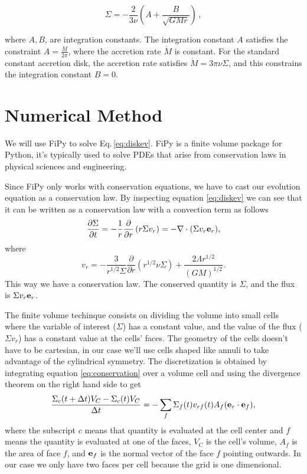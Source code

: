 \documentclass{article}
\begin{document}
\begin{equation}
\Sigma = -\frac{2}{3 \nu} \left(A+  \frac{B}{\sqrt{G M r}}\right)\,,
\end{equation}

where $A, B$, are integration constants. The integration constant $A$ satisfies the constraint $A = \frac{\dot{M}}{2\pi}$, where the accretion rate $\dot{M}$ is constant. For the standard constant accretion disk, the accretion rate satisfies $\dot{M} = 3\pi \nu \Sigma$, and this constrains the integration constant $B = 0$.

\section{Numerical Method}

We will use FiPy to solve Eq.\,\ref{eq:diskev}. FiPy is a finite volume package for Python, it's typically used to
solve PDEs that arise from conservation laws in physical sciences and engineering.

Since FiPy only works with conservation equations, we have to cast our evolution equation as a conservation law.
By inspecting equation \ref{eq:diskev} we can see that it can be written as a conservation law with a convection 
term as follows
\begin{equation} \label{eq:conservation}
\frac{\partial \Sigma}{\partial t} = -\frac{1}{r} \frac{\partial}{\partial r} \left( r \Sigma v_{r}\right)=-\nabla\cdot (\Sigma v_r \bold{e}_{r}),
\end{equation}
where
\begin{equation} \label{eq:vr}
v_r = -\frac{3}{r^{1/2}\Sigma} \frac{\partial}{\partial r} \left(r^{1/2} \nu \Sigma\right) + \frac{2 \Lambda r^{1/2}}{(G M)^{1/2}}.
\end{equation}
This way we have a conservation law. The conserved quantity is $\Sigma$, and the flux is $\Sigma v_r \bold{e}_r$.

The finite volume techinque consists on dividing the volume into small cells where the variable of interest ($\Sigma$) has a constant value,
and the value of the flux ($\Sigma v_r$) has a constant value at the cells' faces. The geometry of the cells doesn't have to be cartesian, in
our case we'll use cells shaped like annuli to take advantage of the cylindrical symmetry.
The discretization is obtained by integrating equation \ref{eq:conservation} over a volume cell and using the divergence theorem on the
right hand side to get
\begin{equation} \label{eq:discretization}
\frac{\Sigma_c(t+\Delta t) V_C - \Sigma_c(t) V_C}{\Delta t} =
-\sum_{f} \Sigma_{f}(t) v_{rf}(t) A_{f} (\bold{e}_r \cdot \bold{e}_{f}),
\end{equation}
where the subscript $c$ means that quantity is evaluated at the cell center and $f$ means the quantity is evaluated at one of the faces,
$V_C$ is the cell's volume, $A_f$ is the area of face $f$, and $\bold{e}_{f}$ is the normal vector of the face $f$ pointing outwards.
In our case we only have two faces per cell because the grid is one 
dimensional.
\end{document}
